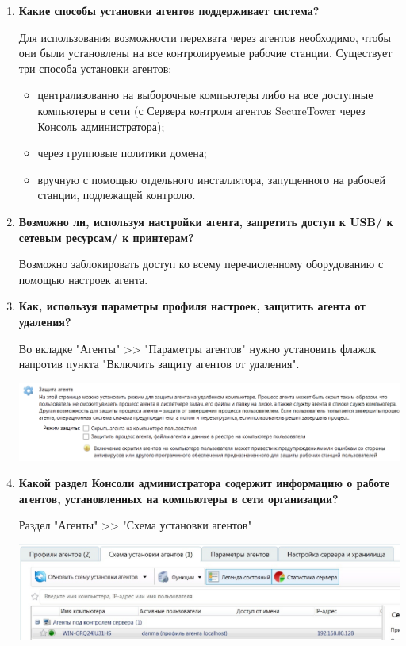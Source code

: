 \documentclass[a4paper,14pt]{extarticle}
\begin{document}
\begin{enumerate}
        \item \textbf{Какие способы установки агентов поддерживает система?}\par
        \qquad Для использования возможности перехвата через агентов необходимо, чтобы они были 
        установлены на все контролируемые рабочие станции. Существует три способа установки 
        агентов: 
        \begin{itemize}
            \item централизованно на выборочные компьютеры либо на все доступные компьютеры в сети (с Сервера контроля агентов SecureTower через Консоль администратора);
            \item через групповые политики домена;
            \item вручную с помощью отдельного инсталлятора, запущенного на рабочей станции, подлежащей контролю. 
        \end{itemize}
        \item \textbf{Возможно ли, используя настройки агента, запретить доступ к USB/ к сетевым ресурсам/ к принтерам?}\par
        \qquad Возможно заблокировать доступ ко всему перечисленному оборудованию с помощью настроек агента.
        \item \textbf{Как, используя параметры профиля настроек, защитить агента от удаления?}\par
        \qquad Во вкладке "Агенты" >> "Параметры агентов" нужно установить флажок напротив пункта "Включить защиту агентов от удаления". 
        \begin{center}
            \includegraphics[scale=0.4]{pics/defence.png}
        \end{center}
        \item \textbf{Какой раздел Консоли администратора содержит информацию о работе агентов, установленных на компьютеры в сети организации?}\par
        \qquad Раздел "Агенты" >> "Схема установки агентов"
        \begin{center}
            \includegraphics[scale=0.6]{pics/agent_install.png}

\end{center}
\end{enumerate}
\end{document}
